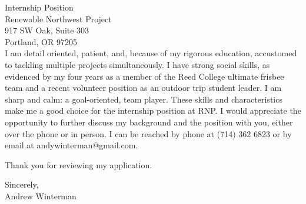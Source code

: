 \documentclass[11pt]{letter} %
\begin{document}
\begin{letter}{
Internship Position\\
Renewable Northwest Project \\
917 SW Oak,
Suite 303 \\
Portland, OR 97205 \\ }
I am detail oriented, patient, and, because of my rigorous education,
accustomed to tackling multiple projects simultaneously. I have strong
social skills, as evidenced by my four years as a member of the Reed
College ultimate frisbee team and a recent volunteer position as an
outdoor trip student leader. I am sharp and calm: a goal-oriented, team
player. These skills and characteristics make me a good choice for the
internship position at %
RNP. I would appreciate the opportunity to further discuss my
background and the position with you, either over the phone or in
person. I can be reached by phone at (714) 362 6823 or by email at
andywinterman@gmail.com.

Thank you for reviewing my application.

Sincerely, \\
Andrew Winterman

\end{letter}
 
\end{document}
